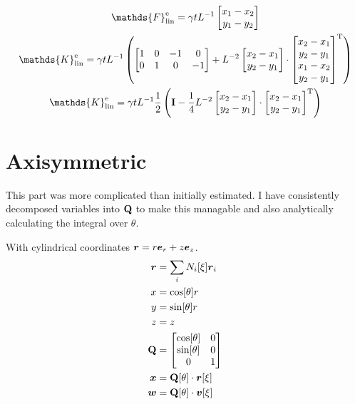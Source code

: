 \documentclass[a4paper,11pt]{article}
\renewcommand{\to}[1]{\text{\boldmath $#1$}} %
\newcommand{\ts}[1]{\text{\boldmath $\rm #1$}} %
\newcommand{\uv}[1]{\mathds{#1}}
\newcommand{\um}[1]{\mathds{#1}}
\newcommand{\T}{{\rm T}}
\newcommand{\element}{{\rm e}}
\newcommand{\linear}{{\rm lin}}
\begin{document}
\begin{gather}
 \uv F^\element_\linear = \gamma t L^{-1} \begin{bmatrix}x_1-x_2\\y_1-y_2\end{bmatrix}\\
 \um K^\element_\linear = \gamma t L^{-1} \left(\begin{bmatrix}1&0&-1&0\\0&1&0&-1\end{bmatrix} + L^{-2} \begin{bmatrix}x_2-x_1\\y_2-y_1\end{bmatrix}\cdot\begin{bmatrix}x_2-x_1\\y_2-y_1\\x_1-x_2\\y_2-y_1\end{bmatrix}^\T\right)\\
 \um K^\element_\linear = \gamma t L^{-1}\frac12 \left(\ts I-\frac14 L^{-2}\begin{bmatrix}x_2-x_1\\y_2-y_1\end{bmatrix}\cdot\begin{bmatrix}x_2-x_1\\y_2-y_1\end{bmatrix}^\T \right)
\end{gather}

\section{Axisymmetric}
This part was more complicated than initially estimated.
I have consistently decomposed variables into $\ts Q$ to make this managable and also analytically calculating the integral over $\theta$.

With cylindrical coordinates $\to r = r\to e_r + z \to e_z$.
\begin{align}
 \to r &= \sum_i N_i[\xi]\to r_i\\
 x &= \cos[\theta] r\\
 y &= \sin[\theta] r\\
 z &= z\\
 \ts Q &= \begin{bmatrix}\cos[\theta] & 0\\ \sin[\theta] & 0\\ 0 & 1\end{bmatrix}\\
 \to x &= \ts Q[\theta] \cdot \to r[\xi]\\
 \to w &= \ts Q[\theta] \cdot \to v[\xi]
\end{align}
\end{document}
